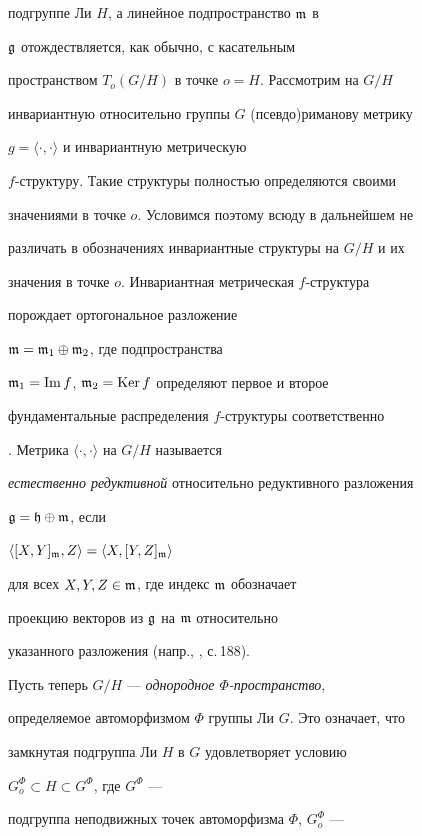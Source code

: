 подгруппе Ли $H$, а линейное подпространство $\frak{m}$ в


$\frak{g}$ отождествляется, как обычно, с касательным


пространством $T_o(G/H)$ в точке $o=H$. Рассмотрим на $G/H$


инвариантную относительно группы $G$ (псевдо)риманову метрику


$g=\langle\cdot,\cdot\rangle$ и инвариантную метрическую


$f$-структуру. Такие структуры полностью определяются своими


значениями в точке $o$. Условимся поэтому всюду в дальнейшем не


различать в обозначениях инвариантные структуры на $G/H$ и их


значения в точке $o$. Инвариантная метрическая $f$-структура


порождает ортогональное разложение


$\frak{m}=\frak{m}_1\oplus\frak{m}_2$, где подпространства


$\frak{m}_1=\operatorname{Im} f$, $\frak{m}_2=\operatorname{Ker} f$ определяют первое и второе


фундаментальные распределения $f$-структуры соответственно 


\cite{4}. Метрика $\langle\cdot,\cdot\rangle$ на $G/H$ называется


{\it естественно редуктивной} относительно редуктивного разложения


$\frak{g}=\frak{h}\oplus\frak{m}$, если


$\langle[X,Y]_{\frak{m}},Z\rangle=\langle X,[Y,Z]_{\frak{m}}\rangle$


для всех $X,Y,Z\in\frak{m}$, где индекс $\frak{m}$ обозначает


проекцию векторов из $\frak{g}$ на $\frak{m}$ относительно


указанного разложения (напр., \cite{24}, с.\,188).





Пусть теперь $G/H$ --- {\it однородное $\Phi$-пространство},


определяемое автоморфизмом $\Phi$ группы Ли $G$. Это означает, что


замкнутая подгруппа Ли $H$ в $G$ удовлетворяет условию


$G_o^{\Phi}\subset{H}\subset{G^{\Phi}}$, где $G^{\Phi}$ ---


подгруппа неподвижных точек автоморфизма $\Phi$, $G_o^{\Phi}$  ---


